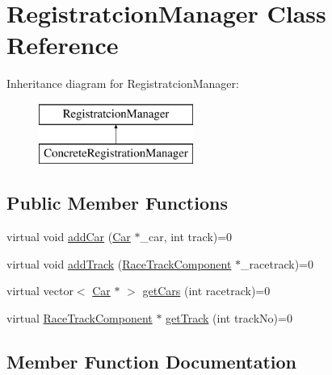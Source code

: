 \hypertarget{class_registratcion_manager}{}\section{Registratcion\+Manager Class Reference}
\label{class_registratcion_manager}
Inheritance diagram for Registratcion\+Manager\+:\begin{figure}[H]
\begin{center}
\leavevmode
\includegraphics[height=2.000000cm]{class_registratcion_manager}
\end{center}
\end{figure}
\subsection*{Public Member Functions}
\begin{DoxyCompactItemize}
\item 
virtual void \mbox{\hyperlink{class_registratcion_manager_aec32edc5e4e17c3816889202f17ca3a5}{add\+Car}} (\mbox{\hyperlink{class_car}{Car}} $\ast$\+\_\+car, int track)=0
\item 
virtual void \mbox{\hyperlink{class_registratcion_manager_a7008cf3cb173f6121f94784ed242a7c6}{add\+Track}} (\mbox{\hyperlink{class_race_track_component}{Race\+Track\+Component}} $\ast$\+\_\+racetrack)=0
\item 
virtual vector$<$ \mbox{\hyperlink{class_car}{Car}} $\ast$ $>$ \mbox{\hyperlink{class_registratcion_manager_a2e06d0bf5f81b2a30d19f242bb2f583d}{get\+Cars}} (int racetrack)=0
\item 
virtual \mbox{\hyperlink{class_race_track_component}{Race\+Track\+Component}} $\ast$ \mbox{\hyperlink{class_registratcion_manager_afc647bf31a1e48c6d6a4b5f1156f9649}{get\+Track}} (int track\+No)=0
\end{DoxyCompactItemize}


\subsection{Member Function Documentation}
\mbox{\label{class_registratcion_manager_aec32edc5e4e17c3816889202f17ca3a5}} 
